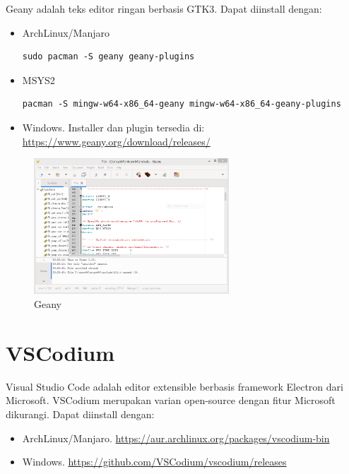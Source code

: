 \documentclass[12pt]{book}
\begin{document}
	Geany adalah teks editor ringan berbasis GTK3.
	Dapat diinstall dengan:
	
	\begin{itemize}
		\item ArchLinux/Manjaro
		\begin{verbatim}
sudo pacman -S geany geany-plugins
		\end{verbatim}
		
		\item MSYS2
		\begin{verbatim}
pacman -S mingw-w64-x86_64-geany mingw-w64-x86_64-geany-plugins
		\end{verbatim}
		
		\item Windows. Installer dan plugin tersedia di:
		\url{https://www.geany.org/download/releases/}
	\end{itemize}
	
	\begin{figure}[!ht]
		\centering
		\includegraphics[width=0.65\textwidth]{images/editor/geany}
		\caption{Geany}
	\end{figure}
	
	\newpage
	\section{VSCodium}
	
	Visual Studio Code adalah editor extensible berbasis framework Electron dari Microsoft.
	VSCodium merupakan varian open-source dengan fitur Microsoft dikurangi.
	Dapat diinstall dengan:
	
	\begin{itemize}
		\item ArchLinux/Manjaro. \url{https://aur.archlinux.org/packages/vscodium-bin}
		\item Windows. \url{https://github.com/VSCodium/vscodium/releases}
	\end{itemize}
	
\end{document}

